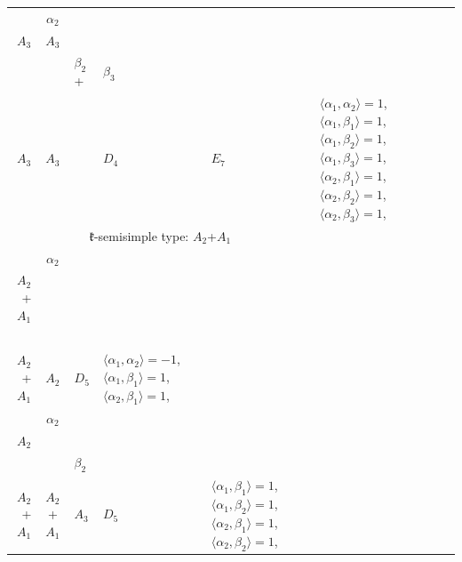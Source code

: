 \documentclass[12pt]{report}
\begin{document}
\begin{appendix}
{\begin{longtable}{rcl p{1cm}p{1cm}p{3cm} }
\begin{tabular}{cc}$\alpha_1$+ & $\alpha_2$\\\tiny{ $A_3$ } & \tiny{ $A_3$ }\end{tabular} &\begin{tabular}{c} = \\~ \end{tabular} & \begin{tabular}{ccc}$\beta_1$+ & $\beta_2$+ & $\beta_3$\\\tiny{ $A_3$ } & \tiny{ $A_3$ } & \tiny{  }\end{tabular} & $D_4$ & $E_7$ & $\langle\alpha_1, \alpha_2\rangle=1$,  $\langle\alpha_1, \beta_1\rangle=1$, $\langle\alpha_1, \beta_2\rangle=1$, $\langle\alpha_1, \beta_3\rangle=1$, $\langle\alpha_2, \beta_1\rangle=1$, $\langle\alpha_2, \beta_2\rangle=1$, $\langle\alpha_2, \beta_3\rangle=1$, 
\\
\hline\multicolumn{5}{c}{$\mathfrak{k}$-semisimple type: $A_2$+$A_1$}\\
\hline\hline\begin{tabular}{cc}$\alpha_1$+ & $\alpha_2$\\\tiny{ $A_2$+$A_1$ } & \tiny{  }\end{tabular} &\begin{tabular}{c} = \\~ \end{tabular} & \begin{tabular}{c}$\beta_1$\\\tiny{ $A_2$+$A_1$ }\end{tabular} & $A_2$ & $D_5$ & $\langle\alpha_1, \alpha_2\rangle=-1$,  $\langle\alpha_1, \beta_1\rangle=1$, $\langle\alpha_2, \beta_1\rangle=1$, 
\\
\begin{tabular}{cc}$\alpha_1$+ & $\alpha_2$\\\tiny{ $A_2$ } & \tiny{  }\end{tabular} &\begin{tabular}{c} = \\~ \end{tabular} & \begin{tabular}{cc}$\beta_1$+ & $\beta_2$\\\tiny{ $A_2$+$A_1$ } & \tiny{ $A_2$+$A_1$ }\end{tabular} & $A_3$ & $D_5$ &  $\langle\alpha_1, \beta_1\rangle=1$, $\langle\alpha_1, \beta_2\rangle=1$, $\langle\alpha_2, \beta_1\rangle=1$, $\langle\alpha_2, \beta_2\rangle=1$, 
\\

\end{longtable}}
\end{appendix}
\end{document}
